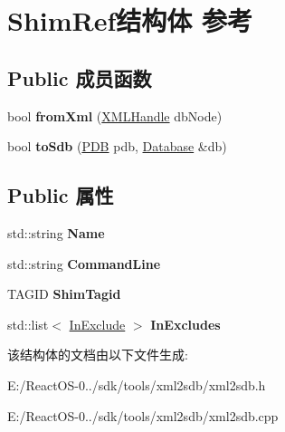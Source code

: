 \hypertarget{struct_shim_ref}{}\section{Shim\+Ref结构体 参考}
\label{struct_shim_ref}
\subsection*{Public 成员函数}
\begin{DoxyCompactItemize}
\item 
\mbox{\label{struct_shim_ref_a25b70196381ad353bdbb2359ce7f91f6}} 
bool {\bfseries from\+Xml} (\hyperlink{classtinyxml2_1_1_x_m_l_handle}{X\+M\+L\+Handle} db\+Node)
\item 
\mbox{\label{struct_shim_ref_a43b2f71c60dfd0a0133b7fc6a702f431}} 
bool {\bfseries to\+Sdb} (\hyperlink{struct___d_b}{P\+DB} pdb, \hyperlink{struct_database}{Database} \&db)
\end{DoxyCompactItemize}
\subsection*{Public 属性}
\begin{DoxyCompactItemize}
\item 
\mbox{\label{struct_shim_ref_a71f7f836e0186990582f08d2c287e8d0}} 
std\+::string {\bfseries Name}
\item 
\mbox{\label{struct_shim_ref_a033971f9b8d10d9112d7ae272bb45baf}} 
std\+::string {\bfseries Command\+Line}
\item 
\mbox{\label{struct_shim_ref_aa10fd1c4114402f519f4ec5914b9b97a}} 
T\+A\+G\+ID {\bfseries Shim\+Tagid}
\item 
\mbox{\label{struct_shim_ref_a8878623c14eae09b67ba3485546ebe50}} 
std\+::list$<$ \hyperlink{struct_in_exclude}{In\+Exclude} $>$ {\bfseries In\+Excludes}
\end{DoxyCompactItemize}


该结构体的文档由以下文件生成\+:\begin{DoxyCompactItemize}
\item 
E\+:/\+React\+O\+S-\/0../sdk/tools/xml2sdb/xml2sdb.\+h\item 
E\+:/\+React\+O\+S-\/0../sdk/tools/xml2sdb/xml2sdb.\+cpp\end{DoxyCompactItemize}
